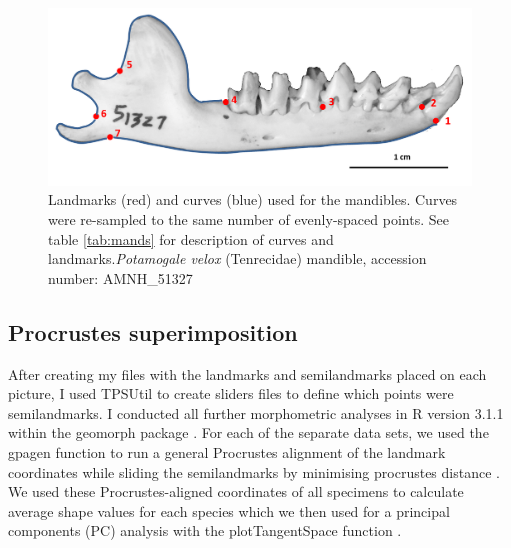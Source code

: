 	\newpage %

\begin{figure}[!htb]
	\centering
	\includegraphics[width=1\linewidth]{Methods/figures/AMNH_51327_landmarksdiagram.png}
	\caption[Mandibles' landmarks]
			{Landmarks (red) and curves (blue) used for the mandibles. Curves were re-sampled to the same number of evenly-spaced points. See table \ref{tab:mands} for description of curves and landmarks.\textit{Potamogale velox} (Tenrecidae) mandible, accession number: AMNH\_51327}
	\label{fig:mands_landmarks}
\end{figure}

\begin{table}[!htb]			
	\centering
	\caption[Mandibles' landmarks]
		{Descriptions of the landmarks (points) and curves (semilandmarks) for the mandibles in lateral (buccal) view (figure \ref{fig:mands_landmarks}}
	
	\label{tab:mands} 
\end{table}

\subsection{Procrustes superimposition}
\label{sect:procrustes}

	After creating my files with the landmarks and semilandmarks placed on each picture, I used TPSUtil \citep{Rohlf2012} to create sliders files \citep{Zelditch2012} to define which points were semilandmarks. I conducted all further morphometric analyses in R version 3.1.1 \citep{Team2014} within the geomorph package \citep{Adams2013}.
	For each of the separate data sets, we used the gpagen function to run a general Procrustes alignment \citep{Rohlf1993} of the landmark coordinates while sliding the semilandmarks by minimising procrustes distance \citep{Bookstein1997}.
	We used these Procrustes-aligned coordinates of all specimens to calculate average shape values for each species which we then used for a principal components (PC) analysis with the plotTangentSpace function \citep{Adams2013}. 


